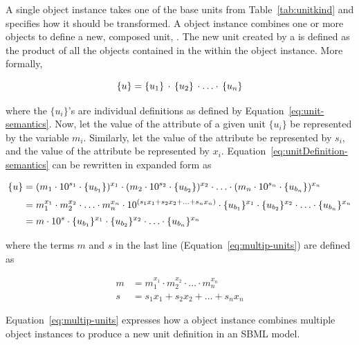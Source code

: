 A single \Unit object instance takes one of the base units from
Table~\ref{tab:unitkind} and specifies how it should be
transformed.  A \UnitDefinition object instance combines one or
more \Unit objects to define a new, composed unit, \udef.  The new
unit \udef created by a \UnitDefinition is defined as the product
of all the \Unit objects contained in the \ListOfUnits within the
\UnitDefinition object instance.  More formally, 
\begin{linenomath}
\begin{equation}
  \{u\} = \{u_1\} \, \cdot \, \{u_2\} \, \cdot \ldots \cdot \, \{u_n\} 
\label{eq:unitDefinition-semantics}
\end{equation}
\end{linenomath}
where the $\{u_i\}$'s are individual \Unit definitions as defined
by Equation~\ref{eq:unit-semantics}.  Now, let the value of the
 attribute of a given unit $\{u_i\}$ be
represented by the variable $m_i$.  Similarly, let the value of
the  attribute be represented by $s_i$, and the value
of the  attribute be represented by $x_i$.
Equation~\ref{eq:unitDefinition-semantics} can be rewritten in
expanded form as
\begin{linenomath}
\begin{align}
  \{u\} &= (m_1 \cdot 10^{s_1} \cdot \{u_{b_1}\})^{x_1} \cdot
           (m_2 \cdot 10^{s_2} \cdot \{u_{b_2}\})^{x_2} \cdot \ldots \cdot (m_n \cdot
           10^{s_n} \cdot \{u_{b_n}\})^{x_n} \notag \\[2pt]
        &= m_1^{x_1} \cdot m_2^{x_2} \cdot \ldots \cdot m_n^{x_n}
           \cdot 10^{(s_1 x_1 + s_2 x_2 + \ldots + s_n x_n)}
           \cdot \{u_{b_1}\}^{x_1} \cdot \{u_{b_2}\}^{x_2} \cdot \ldots \cdot \{u_{b_n}\}^{x_n} \notag \\[2pt]
        &= m \cdot 10^{s} \cdot \{u_{b_1}\}^{x_1} \cdot \{u_{b_2}\}^{x_2} \cdot \ldots \cdot \{u_{b_n}\}^{x_n}
\label{eq:multip-units}
\end{align}
\end{linenomath}
where the terms $m$ and $s$ in the last line
(Equation~\ref{eq:multip-units}) are defined as
\begin{linenomath}
\begin{align*}
  m &= m_1^{x_1} \cdot m_2^{x_2} \cdot \ldots \cdot m_n^{x_n} \\
  s &= s_1 x_1 + s_2 x_2 + \ldots + s_n x_n
\end{align*}
\end{linenomath}
Equation~\ref{eq:multip-units} expresses how a \UnitDefinition
object instance combines multiple \Unit object instances to
produce a new unit definition in an SBML model.


